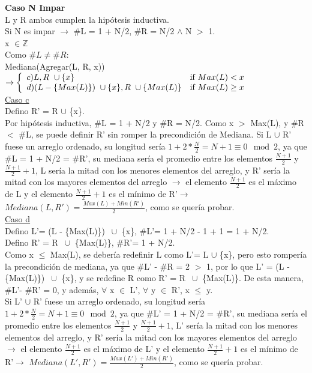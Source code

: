 \documentclass{article}
\theoremstyle{definition}
\theoremstyle{remark}
\begin{document}
\textbf{Caso N Impar} \\ 

L y R ambos cumplen la hipótesis inductiva.\\

Si N es impar $\rightarrow$ \#L = 1 + N/2, \#R = N/2 $\wedge$ N $>$ 1.\\ 

x $\in \mathds{Z}$ \\

Como $\#L \neq \#R$: \\

Mediana(Agregar(L, R, x)) $\rightarrow \left\{ \begin{array}{ll} c) L, R \ \cup \{x\} & \mbox{if } Max(L) < x \\ d) (L - \{Max(L)\}) \ \cup \{x\}, R \ \cup \{Max(L)\}  & \mbox{if } Max(L) \geq x \\ \end{array} \right.$\\
                                    
\underline{Caso c} \\

Defino R' = R $\cup$ \{x\}. \\

Por hipótesis inductiva, \#L = 1 + N/2 y \#R = N/2. Como x $>$ Max(L), y \#R $<$ \#L, se puede definir R' sin romper la precondición de Mediana.
Si L $\cup$ R' fuese un arreglo ordenado, su longitud sería $1 + 2 * \frac{N}{2} = N + 1 \equiv 0 \mod 2$, ya que \#L = 1 + N/2 = \#R', su mediana sería el promedio entre los elementos $\frac{N+1}{2}$ y $\frac{N+1}{2} + 1$, L sería la mitad con los menores elementos del arreglo, y R' sería la mitad con los mayores elementos del arreglo $\rightarrow$ el elemento $\frac{N+1}{2}$ es el máximo de L y el elemento $\frac{N+1}{2} + 1$ es el mínimo de R'$\rightarrow$ $Mediana(L, R') = \frac{Max(L) + Min(R')}{2}$, como se quería probar. \\

\underline{Caso d} \\

Defino L'= (L - \{Max(L)\}) $\ \cup$ \{x\}, \#L'= 1 + N/2 - 1 + 1 = 1 + N/2. \\

Defino R' = R $\ \cup$ \{Max(L)\}, \#R'= 1 + N/2. \\

Como x $\leq$ Max(L), se debería redefinir L como L'= L $\cup$ \{x\}, pero esto rompería la precondición de mediana, ya que \#L' - \#R = 2 $>$ 1, por lo que L' = (L - \{Max(L)\}) $\ \cup$ \{x\}, y se redefine R como R' = R $\ \cup$ \{Max(L)\}. De esta manera, \#L'- \#R' = 0, y además, $\forall$ x $\in$ L', $\forall$ y $\in$ R', x $\leq$ y. \\
Si L' $\cup$ R' fuese un arreglo ordenado, su longitud sería $1 + 2 * \frac{N}{2} = N + 1 \equiv 0 \mod 2$, ya que \#L' = 1 + N/2 = \#R', su mediana sería el promedio entre los elementos $\frac{N+1}{2}$ y $\frac{N+1}{2} + 1$, L' sería la mitad con los menores elementos del arreglo, y R' sería la mitad con los mayores elementos del arreglo $\rightarrow$ el elemento $\frac{N+1}{2}$ es el máximo de L' y el elemento $\frac{N+1}{2} + 1$ es el mínimo de R'$\rightarrow$ $Mediana(L', R') = \frac{Max(L') + Min(R')}{2}$, como se quería probar. \\
\end{document}
